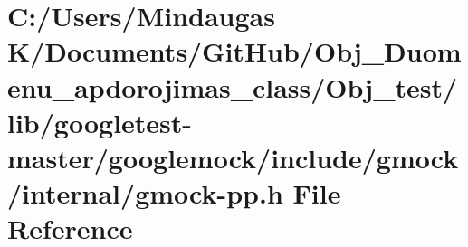 \hypertarget{_obj__test_2lib_2googletest-master_2googlemock_2include_2gmock_2internal_2gmock-pp_8h}{}\section{C\+:/\+Users/\+Mindaugas K/\+Documents/\+Git\+Hub/\+Obj\+\_\+\+Duomenu\+\_\+apdorojimas\+\_\+class/\+Obj\+\_\+test/lib/googletest-\/master/googlemock/include/gmock/internal/gmock-\/pp.h File Reference}
\label{_obj__test_2lib_2googletest-master_2googlemock_2include_2gmock_2internal_2gmock-pp_8h}
